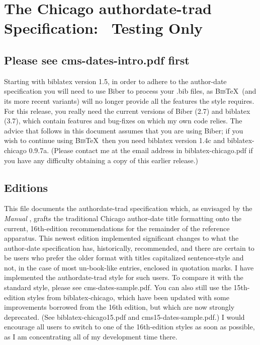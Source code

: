 \documentclass[a4paper,12pt]{report}
\begin{document}
\section*{The Chicago authordate-trad Specification:%
  \ Testing Only}
\label{sec:spec}

\subsection*{Please see cms-dates-intro.pdf first}
\label{bibernote}

Starting with \textsf{biblatex} version 1.5, in order to adhere to the
author-date specification you will need to use \textsf{Biber} to
process your .bib files, as \textsc{Bib}\TeX\ (and its more recent
variants) will no longer provide all the features the style requires.
For this release, you really need the current versions of
\textsf{Biber} (2.7) and \textsf{biblatex} (3.7), which contain
features and bug-fixes on which my own code relies.  The advice that
follows in this document assumes that you are using \textsf{Biber}; if
you wish to continue using \textsc{Bib}\TeX\ then you need
\textsf{biblatex} version 1.4c and \textsf{biblatex-chicago} 0.9.7a.
(Please contact me at the email address in
\textsf{biblatex-chicago.pdf} if you have any difficulty obtaining a
copy of this earlier release.)

\subsection*{Editions}
\label{editions}

This file documents the \textsf{authordate-trad} specification which,
as envisaged by the \emph{Manual} \autocite*[15.45]{chicago:manual},
grafts the traditional Chicago author-date title formatting onto the
current, 16th-edition recommendations for the remainder of the
reference apparatus.  This newest edition implemented significant
changes to what the author-date specification has, historically,
recommended, and there are certain to be users who prefer the older
format with titles capitalized sentence-style and not, in the case of
most un-book-like entries, enclosed in quotation marks.  I have
implemented the \textsf{authordate-trad} style for such users.  To
compare it with the standard style, please see
\textsf{cms-dates-sample.pdf}.  You can also still use the
15th-edition styles from \textsf{biblatex-chicago}, which have been
updated with some improvements borrowed from the 16th edition, but
which are now strongly deprecated.  (See
\textsf{biblatex-chicago15.pdf} and \textsf{cms15-dates-sample.pdf}.)
I would encourage all users to switch to one of the 16th-edition
styles as soon as possible, as I am concentrating all of my
development time there.
\end{document}
